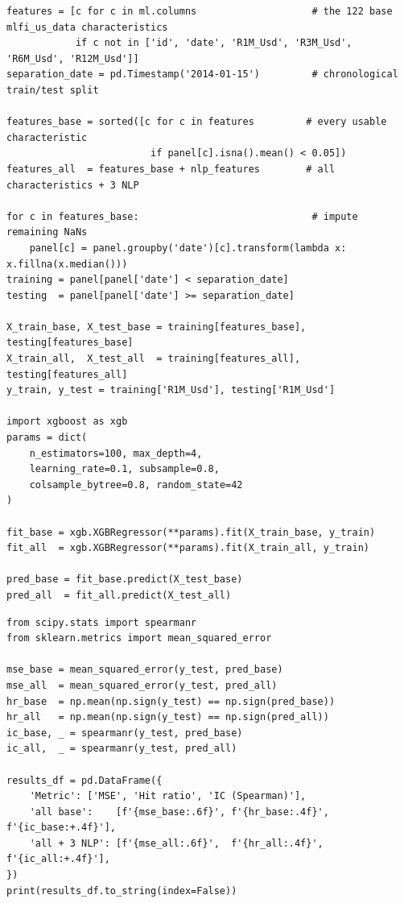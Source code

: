 \begin{verbatim}
features = [c for c in ml.columns                    # the 122 base mlfi_us_data characteristics
            if c not in ['id', 'date', 'R1M_Usd', 'R3M_Usd', 'R6M_Usd', 'R12M_Usd']]
separation_date = pd.Timestamp('2014-01-15')         # chronological train/test split

features_base = sorted([c for c in features         # every usable characteristic
                         if panel[c].isna().mean() < 0.05])
features_all  = features_base + nlp_features        # all characteristics + 3 NLP

for c in features_base:                              # impute remaining NaNs
    panel[c] = panel.groupby('date')[c].transform(lambda x: x.fillna(x.median()))
training = panel[panel['date'] < separation_date]
testing  = panel[panel['date'] >= separation_date]

X_train_base, X_test_base = training[features_base], testing[features_base]
X_train_all,  X_test_all  = training[features_all],  testing[features_all]
y_train, y_test = training['R1M_Usd'], testing['R1M_Usd']

import xgboost as xgb
params = dict(
    n_estimators=100, max_depth=4,
    learning_rate=0.1, subsample=0.8,
    colsample_bytree=0.8, random_state=42
)

fit_base = xgb.XGBRegressor(**params).fit(X_train_base, y_train)
fit_all  = xgb.XGBRegressor(**params).fit(X_train_all, y_train)

pred_base = fit_base.predict(X_test_base)
pred_all  = fit_all.predict(X_test_all)
\end{verbatim}

\begin{verbatim}
from scipy.stats import spearmanr
from sklearn.metrics import mean_squared_error

mse_base = mean_squared_error(y_test, pred_base)
mse_all  = mean_squared_error(y_test, pred_all)
hr_base  = np.mean(np.sign(y_test) == np.sign(pred_base))
hr_all   = np.mean(np.sign(y_test) == np.sign(pred_all))
ic_base, _ = spearmanr(y_test, pred_base)
ic_all,  _ = spearmanr(y_test, pred_all)

results_df = pd.DataFrame({
    'Metric': ['MSE', 'Hit ratio', 'IC (Spearman)'],
    'all base':    [f'{mse_base:.6f}', f'{hr_base:.4f}', f'{ic_base:+.4f}'],
    'all + 3 NLP': [f'{mse_all:.6f}',  f'{hr_all:.4f}',  f'{ic_all:+.4f}'],
})
print(results_df.to_string(index=False))
\end{verbatim}

